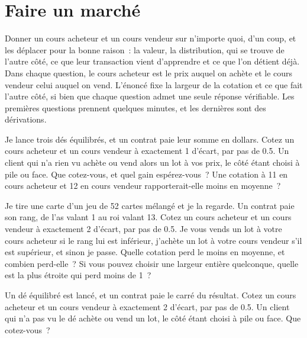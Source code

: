 \chapter{Faire un marché}\label{ch:iv2:making-a-market}

\begin{ivtrains}
Donner un cours acheteur et un cours vendeur sur n'importe quoi, d'un coup, et les déplacer pour la bonne raison~: la valeur, la distribution, qui se trouve de l'autre côté, ce que leur transaction vient d'apprendre et ce que l'on détient déjà. Dans chaque question, le cours acheteur est le prix auquel on achète et le cours vendeur celui auquel on vend. L'énoncé fixe la largeur de la cotation et ce que fait l'autre côté, si bien que chaque question admet une seule réponse vérifiable. Les premières questions prennent quelques minutes, et les dernières sont des dérivations.
\end{ivtrains}

\begin{question}\label{iq:iv2:making-a-market:1}
Je lance trois dés équilibrés, et un contrat paie leur somme en dollars. Cotez un cours acheteur et un cours vendeur à exactement 1 d'écart, par pas de 0.5. Un client qui n'a rien vu achète ou vend alors un lot à vos prix, le côté étant choisi à pile ou face. Que cotez-vous, et quel gain espérez-vous~? Une cotation à 11 en cours acheteur et 12 en cours vendeur rapporterait-elle moins en moyenne~?
\end{question}

\begin{question}\label{iq:iv2:making-a-market:2}
Je tire une carte d'un jeu de 52 cartes mélangé et je la regarde. Un contrat paie son rang, de l'as valant 1 au roi valant 13. Cotez un cours acheteur et un cours vendeur à exactement 2 d'écart, par pas de 0.5. Je vous vends un lot à votre cours acheteur si le rang lui est inférieur, j'achète un lot à votre cours vendeur s'il est supérieur, et sinon je passe. Quelle cotation perd le moins en moyenne, et combien perd-elle~? Si vous pouvez choisir une largeur entière quelconque, quelle est la plus étroite qui perd moins de 1~?
\end{question}

\begin{question}\label{iq:iv2:making-a-market:3}
Un dé équilibré est lancé, et un contrat paie le carré du résultat. Cotez un cours acheteur et un cours vendeur à exactement 2 d'écart, par pas de 0.5. Un client qui n'a pas vu le dé achète ou vend un lot, le côté étant choisi à pile ou face. Que cotez-vous~?
\end{question}

